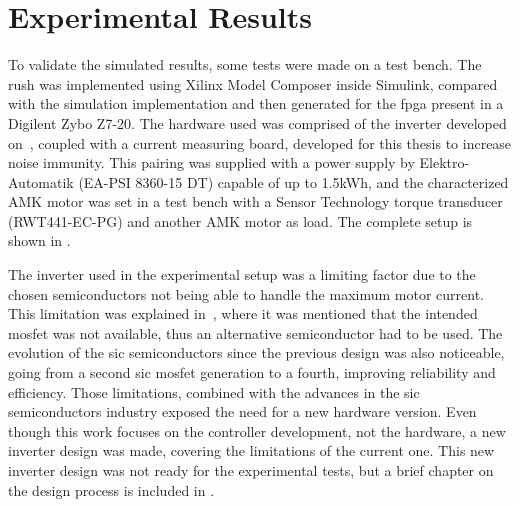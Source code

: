 \section{Experimental Results}
\label{section:experimental}%
\vfill

To validate the simulated results, some tests were made on a test bench. The \gls{rush} was implemented using Xilinx Model Composer inside Simulink, compared with the simulation implementation and then generated for the \gls{fpga} present in a Digilent Zybo Z7-20. The hardware used was comprised of the inverter developed on~\cite{Costa:MSc}, coupled with a current measuring board, developed for this thesis to increase noise immunity. This pairing was supplied with a power supply by Elektro-Automatik (EA-PSI 8360-15 DT) capable of up to 1.5kWh, and the characterized AMK motor was set in a test bench with a Sensor Technology torque transducer (RWT441-EC-PG) and another AMK motor as load. The complete setup is shown in .

The inverter used in the experimental setup was a limiting factor due to the chosen semiconductors not being able to handle the maximum motor current. This limitation was explained in~\cite{Costa:MSc}, where it was mentioned that the intended \gls{mosfet} was not available, thus an alternative semiconductor had to be used. The evolution of the \gls{sic} semiconductors since the previous design was also noticeable, going from a second \gls{sic} \gls{mosfet} generation to a fourth, improving reliability and efficiency. Those limitations, combined with the advances in the \gls{sic} semiconductors industry exposed the need for a new hardware version. Even though this work focuses on the controller development, not the hardware, a new inverter design was made, covering the limitations of the current one. This new inverter design was not ready for the experimental tests, but a brief chapter on the design process is included in .

